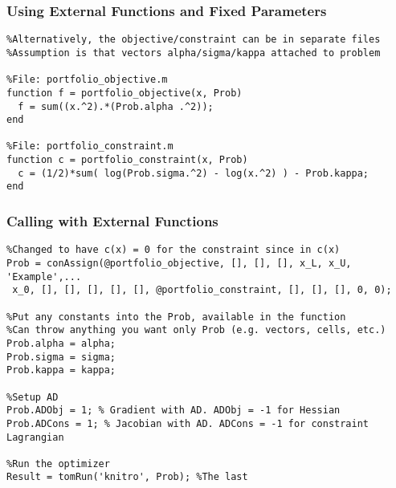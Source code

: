 \documentclass[nofootline]{etk-presentation}
\begin{document}
\begin{frame}[fragile]	\frametitle{Using External Functions and Fixed Parameters}

\begin{verbatim}
%Alternatively, the objective/constraint can be in separate files
%Assumption is that vectors alpha/sigma/kappa attached to problem

%File: portfolio_objective.m
function f = portfolio_objective(x, Prob)
  f = sum((x.^2).*(Prob.alpha .^2));
end

%File: portfolio_constraint.m
function c = portfolio_constraint(x, Prob)
  c = (1/2)*sum( log(Prob.sigma.^2) - log(x.^2) ) - Prob.kappa;
end
\end{verbatim}	
\end{frame}	

\begin{frame}[fragile]	\frametitle{Calling with External Functions}
\begin{verbatim}
%Changed to have c(x) = 0 for the constraint since in c(x)
Prob = conAssign(@portfolio_objective, [], [], [], x_L, x_U, 'Example',...
 x_0, [], [], [], [], [], @portfolio_constraint, [], [], [], 0, 0);

%Put any constants into the Prob, available in the function
%Can throw anything you want only Prob (e.g. vectors, cells, etc.)
Prob.alpha = alpha;
Prob.sigma = sigma;
Prob.kappa = kappa;

%Setup AD
Prob.ADObj = 1; % Gradient with AD. ADObj = -1 for Hessian
Prob.ADCons = 1; % Jacobian with AD. ADCons = -1 for constraint Lagrangian 

%Run the optimizer
Result = tomRun('knitro', Prob); %The last 	
\end{verbatim}	
\end{frame}	
	
\begin{frame}\frametitle{}
	\bigskip
	\bigskip
	\bigskip	
	\begin{center}
		{\huge {}}
	\end{center}
\end{frame}
\end{document}
